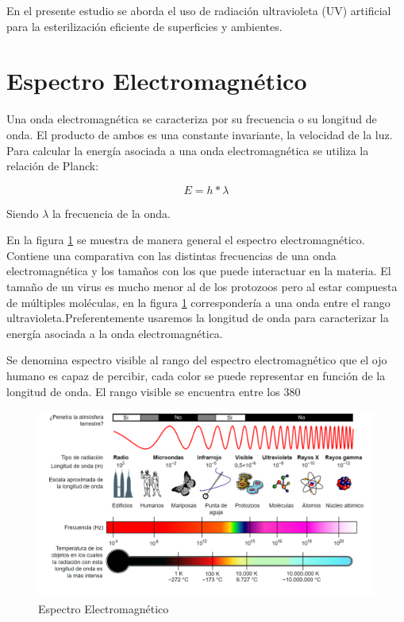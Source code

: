 \documentclass[letterpaper,11pt]{article}
\begin{document}
En el presente estudio se aborda el uso de radiación ultravioleta (UV) artificial para la esterilización eficiente de superficies y ambientes.

\section{Espectro Electromagnético}  

Una onda electromagnética se caracteriza por su frecuencia o su longitud de onda. El producto de ambos es una constante invariante, la velocidad de la luz. Para calcular la energía asociada a una onda electromagnética se utiliza la relación de Planck:

\begin{equation}
E= h * \lambda
\label{plank}
\end{equation}

Siendo $\lambda$ la frecuencia de la onda.


En la figura \ref{espectro} se muestra de manera general el espectro electromagnético. Contiene una comparativa con las distintas frecuencias de una onda electromagnética y los tamaños con los que puede interactuar en la materia. 
El tamaño de un virus es mucho menor al de los protozoos pero al estar compuesta de múltiples moléculas, en la figura \ref{espectro} correspondería a una onda entre el rango ultravioleta.Preferentemente usaremos la longitud de onda para caracterizar la energía asociada a la onda electromagnética. 

Se denomina espectro visible al rango del espectro electromagnético que el ojo humano es capaz de percibir, cada color se puede representar en función de la longitud de onda. El rango visible se encuentra entre los 380  


\begin{figure}[hbt!]
\includegraphics[width=\textwidth,scale=0.3]{espectro.png}
\caption{Espectro Electromagnético}
\label{espectro}
\end{figure}




\end{document}
